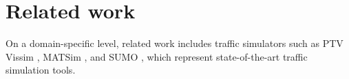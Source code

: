 \documentclass[graybox]{svmult}
\begin{document}








\section{Related work}
\label{sec:related}
On a domain-specific level, related work includes traffic simulators such as PTV Vissim \cite{fellendorf_vissim_1994}, MATSim \cite{w_axhausen_multi-agent_2016}, and SUMO  \cite{lopez_microscopic_2018}, which represent state-of-the-art traffic simulation tools.
\end{document}
